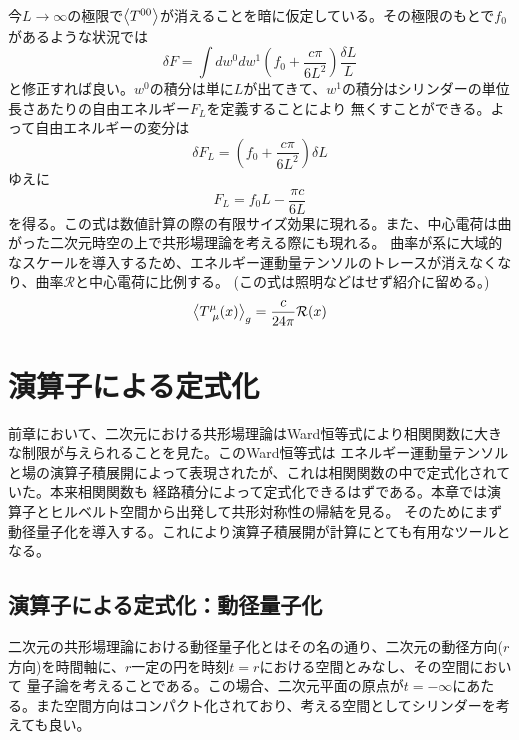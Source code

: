 \documentclass[11pt, aps, longbibliography]{article}
\numberwithin{equation}{section}
\begin{document}
        今$L\rightarrow \infty$の極限で$\expval{T^{00}}$が消えることを暗に仮定している。その極限のもとで$f_0$があるような状況では
        \begin{equation}\label{eq:centralcharge8}
            \delta F = \int dw^0 dw^1 \left(f_0 +  \frac{c\pi}{6L^2}\right) \frac{\delta L}{L}
        \end{equation}
        と修正すれば良い。$w^0$の積分は単に$L$が出てきて、$w^1$の積分はシリンダーの単位長さあたりの自由エネルギー$F_L$を定義することにより
        無くすことができる。よって自由エネルギーの変分は
        \begin{equation}\label{eq:centralcharge9}
            \delta F_L = \left(f_0 +  \frac{c\pi}{6L^2}\right) \delta L
        \end{equation}
        ゆえに
        \begin{equation}\label{eq:centralcharge10}
            F_L = f_0 L - \frac{\pi c}{6L}
        \end{equation}
        を得る。この式は数値計算の際の有限サイズ効果に現れる。また、中心電荷は曲がった二次元時空の上で共形場理論を考える際にも現れる。
        曲率が系に大域的なスケールを導入するため、エネルギー運動量テンソルのトレースが消えなくなり、曲率$\mathcal{R}$と中心電荷に比例する。
        (この式は照明などはせず紹介に留める。)
        \begin{equation}\label{eq:centralcharge11}
            \expval{T^\mu_{\ \mu}(x)}_g = \frac{c}{24\pi}\mathcal{R}(x)
        \end{equation}
\newpage

\section{演算子による定式化}
    前章において、二次元における共形場理論はWard恒等式により相関関数に大きな制限が与えられることを見た。このWard恒等式は
    エネルギー運動量テンソルと場の演算子積展開によって表現されたが、これは相関関数の中で定式化されていた。本来相関関数も
    経路積分によって定式化できるはずである。本章では演算子とヒルベルト空間から出発して共形対称性の帰結を見る。
    そのためにまず動径量子化を導入する。これにより演算子積展開が計算にとても有用なツールとなる。
    \subsection{演算子による定式化：動径量子化}
    二次元の共形場理論における動径量子化とはその名の通り、二次元の動径方向($r$方向)を時間軸に、$r$一定の円を時刻$t=r$における空間とみなし、その空間において
    量子論を考えることである。この場合、二次元平面の原点が$t=-\infty$にあたる。また空間方向はコンパクト化されており、考える空間としてシリンダーを考えても良い。
\end{document}
